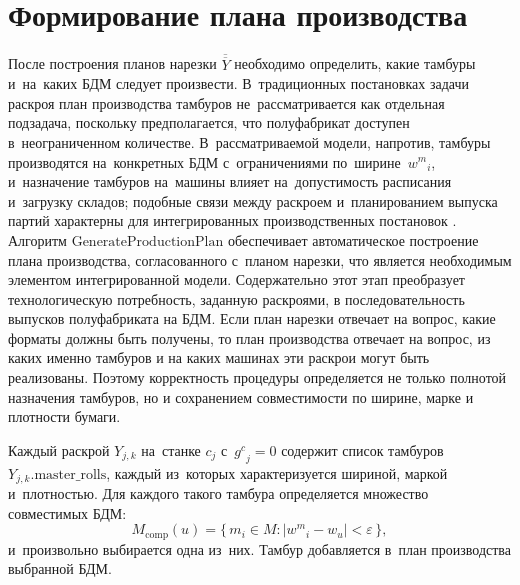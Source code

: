 \section{Формирование плана производства}\label{sec:alg/production_plans}

После построения планов нарезки $\overline{\overline{Y}}$ необходимо определить, какие тамбуры и~на~каких БДМ следует произвести.
В~традиционных постановках задачи раскроя \cite{haessler1991,gilmore1961linear} план производства тамбуров не~рассматривается как отдельная подзадача, поскольку предполагается, что полуфабрикат доступен в~неограниченном количестве.
В~рассматриваемой модели, напротив, тамбуры производятся на~конкретных БДМ с~ограничениями по~ширине~${w^m}_i$, и~назначение тамбуров на~машины влияет на~допустимость расписания и~загрузку складов; подобные связи между раскроем и~планированием выпуска партий характерны для интегрированных производственных постановок \cite{pochet2006_prodplan_mip, melega2018review}.
Алгоритм $\mathrm{GenerateProductionPlan}$ обеспечивает автоматическое построение плана производства, согласованного с~планом нарезки, что является необходимым элементом интегрированной модели.
Содержательно этот этап преобразует технологическую потребность, заданную раскроями, в последовательность выпусков полуфабриката на БДМ. Если план нарезки отвечает на вопрос, какие форматы должны быть получены, то план производства отвечает на вопрос, из каких именно тамбуров и на каких машинах эти раскрои могут быть реализованы. Поэтому корректность процедуры определяется не только полнотой назначения тамбуров, но и сохранением совместимости по ширине, марке и плотности бумаги.

Каждый раскрой $Y_{j,k}$ на~станке $c_j$ с~${g^c}_j=0$ содержит список тамбуров $Y_{j,k}.\mathrm{master\_rolls}$, каждый из~которых характеризуется шириной, маркой и~плотностью.
Для каждого такого тамбура определяется множество совместимых БДМ:
\[
M_{\mathrm{comp}}(u) = \bigl\{\,m_i\in M : |{w^m}_i - w_u| < \varepsilon\,\bigr\},
\]
и~произвольно выбирается одна из~них.
Тамбур добавляется в~план производства выбранной БДМ.

\begin{center}
\resizebox{!}{0.8\textheight}{%
    
}
\label{alg:generate_pm_plans}
\end{center}

